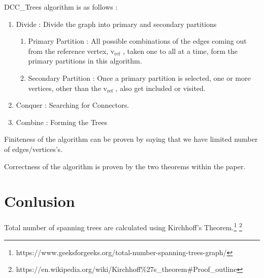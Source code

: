 \documentclass[11pt]{article}
\begin{document}
DCC\_Trees algorithm is as follows : 

\begin{enumerate}
\item Divide : Divide the graph into primary and secondary partitions
	\begin{enumerate}
		\item Primary Partition : All possible combinations of the edges coming out from the reference vertex, $\mathrm{v_{ref}}$ , taken one to all at a time, form the primary partitions in this algorithm.
		\item Secondary Partition  : Once a primary partition is selected, one or more vertices, other than the $\mathrm{v_{ref}}$ , also get included or visited.
	\end{enumerate}
\item Conquer : Searching for Connectors. 
\item Combine : Forming the Trees
\end{enumerate}


Finiteness of the algorithm can be proven by saying that we have limited number of edges/vertices's.

Correctness of the algorithm is proven by the two theorems within the paper. 

\cite[chapter 2, p.~215]{wolframPolynomial}


\section{Conlusion}
Total number of spanning trees are calculated using  Kirchhoff’s Theorem.\footnote{https://www.geeksforgeeks.org/total-number-spanning-trees-graph/}
\footnote{https://en.wikipedia.org/wiki/Kirchhoff\%27s\_theorem\#Proof\_outline}
\end{document}
